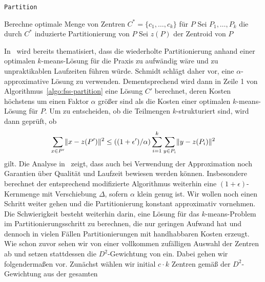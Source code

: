 \begin{algorithm}
\caption{\texttt{Partition}~\cite{FeldmanSS13,Schmidt14}}
\label{algo:fss-partition}
	\DontPrintSemicolon
	
	\BlankLine
	
	Berechne optimale Menge von Zentren $C^* = \{c_1, \dots, c_k\}$ für $P$\;
	Sei $P_1, \dots, P_k$ die durch $C^*$ induzierte Partitionierung von $P$\;
	Sei $z(P)$ der Zentroid von $P$\;
\end{algorithm}
In~\cite{Schmidt14} wird bereits thematisiert, dass die wiederholte Partitionierung anhand einer optimalen $k$-means-Lösung
für die Praxis zu aufwändig wäre und zu unpraktikablen Laufzeiten führen würde. Schmidt schlägt daher vor, eine
$\alpha$-approximative Lösung zu verwenden. Dementsprechend wird dann in Zeile 1 von Algorithmus~\ref{algo:fss-partition}
eine Lösung $C'$ berechnet, deren Kosten höchstens um einen Faktor $\alpha$ größer sind als die Kosten einer optimalen
$k$-means-Lösung für $P$. Um zu entscheiden, ob die Teilmengen $k$-strukturiert sind, wird dann geprüft, ob
\[ \sum_{x \in P'} \lVert {x} - {z(P')} \rVert^2 \leq ((1+\epsilon')/\alpha) \sum_{i=1}^{k} \sum_{y \in P_i} \lVert {y} - {z(P_i)} \rVert^2 \]
gilt. Die Analyse in~\cite{Schmidt14} zeigt, dass auch bei Verwendung der Approximation noch Garantien über Qualität und
Laufzeit bewiesen werden können. Insbesondere berechnet der entsprechend modifizierte Algorithmus weiterhin eine
$(1+\epsilon)$-Kernmenge mit Verschiebung $\Delta$, sofern $\alpha$ klein genug ist.
\absatz
Wir wollen noch einen Schritt weiter gehen und die Partitionierung konstant approximativ vornehmen. Die Schwierigkeit besteht weiterhin
darin, eine Lösung für das $k$-means-Problem im Partitionierungsschritt zu berechnen, die nur geringen Aufwand
hat und dennoch in vielen Fällen Partitionierungen mit handhabbaren Kosten erzeugt. Wie schon zuvor sehen wir von einer
vollkommen zufälligen Auswahl der Zentren ab und setzen stattdessen die $D^2$-Gewichtung von \kmpp{} ein. Dabei gehen
wir folgendermaßen vor. Zunächst wählen wir initial $c \cdot k$ Zentren gemäß der $D^2$-Gewichtung aus der gesamten
